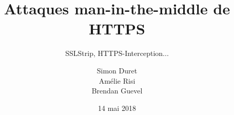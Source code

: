 \documentclass{bredelebeamer}
\title[Attaques sur connexions HTTPS]{Attaques man-in-the-middle de HTTPS}
\subtitle{SSLStrip, HTTPS-Interception...}
\author[S. Duret - A. Risi - B. Guevel]{Simon Duret \\ Amélie Risi \\ Brendan Guevel}
\institute[]{
  \texttt{[image: ../medias/universite-bordeaux.pdf]}
}
\date{14 mai 2018}
\begin{document}
\begin{frame}
  \titlepage
\end{frame}




















\end{document}
